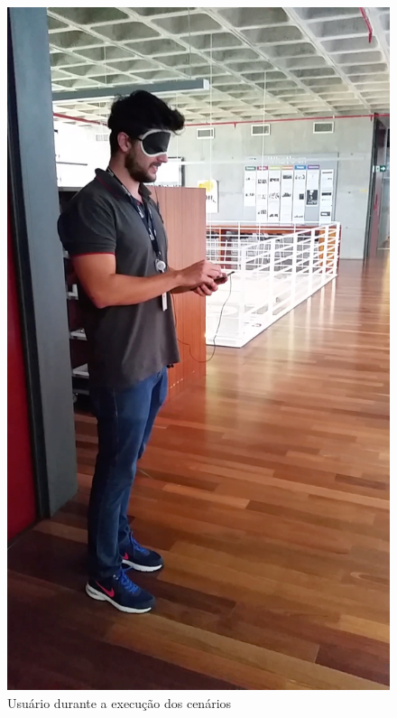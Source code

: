 \documentclass[twoside,english,brazilian]{UNISINOSartigo}
\begin{document}
	\begin{figure}[!ht]
		\caption{Usuário durante a execução dos cenários}
		\label{fig:usuario}
		\centering%
		\begin{minipage}{0.3\textwidth}
			\includegraphics[width=\textwidth]{imgs/execucaoCenario}
		\end{minipage}
	\end{figure}
\end{document}
